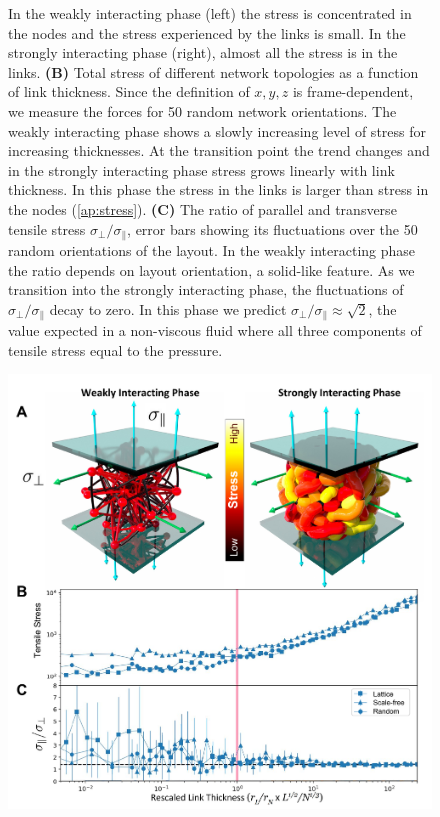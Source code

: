 \documentclass[nofootinbib,preprint,floatfix,titlepage,superscriptaddress]{revtex4} %
\begin{document}
\begin{figure}
{    %
    In the weakly interacting phase (left) the stress is concentrated in the nodes and the stress experienced by the links is small. 
    In the strongly interacting phase (right), almost all the stress is in the links.  
    {\bf (B)} Total stress of different network topologies as a function of link thickness. Since the definition of $x,y,z$ is frame-dependent, we measure the forces for 50 random network orientations. 
    The weakly interacting phase shows a slowly increasing level of stress for increasing thicknesses. %
    At the transition point the trend changes and in the strongly interacting phase stress grows linearly with link thickness. 
    In this phase the stress in the links is larger than stress in the nodes (\ref{ap:stress}). 
    {\bf (C)} The ratio of parallel and transverse tensile stress $\sigma_\perp/\sigma_\parallel$, error bars showing its fluctuations over the 50 random orientations of the layout. 
    In the weakly interacting phase the ratio depends on layout orientation,
    a solid-like feature.
    As we transition into the strongly interacting phase, the fluctuations of $\sigma_\perp/\sigma_\parallel$ decay to zero. 
    In this phase we predict $\sigma_\perp/\sigma_\parallel \approx \sqrt{2}$, 
    the value expected in a non-viscous fluid where all three components of tensile stress equal to the pressure.}
    \label{fig:stress}
\end{figure}
\begin{figure}
    \centering
    \includegraphics[width=.9\columnwidth]{fig-09-19/3D-stress-111917-1.pdf}
\end{figure}
\end{document}

